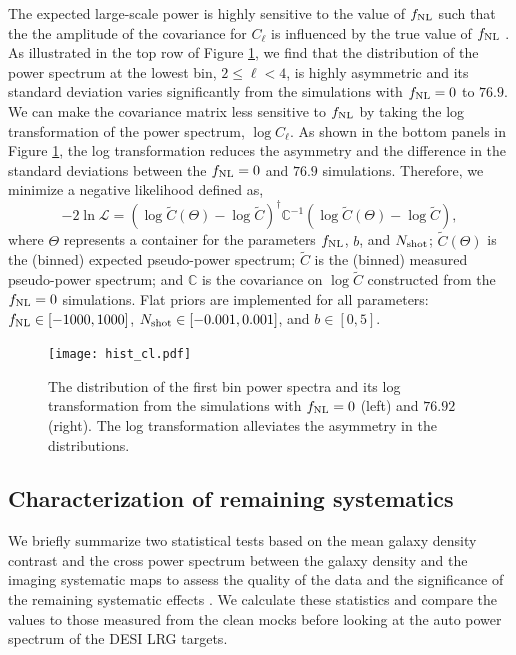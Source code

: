 The expected large-scale power is highly sensitive to the value of $f_{\rm NL}$ such that the the amplitude of the covariance for $C_{\ell}$ is influenced by the true value of $f_{\rm NL}$ \citep[see, e.g.,][for a discussion]{2013MNRAS.428.1116R}. As illustrated in the top row of Figure \ref{fig:histcell}, we find that the distribution of the power spectrum at the lowest bin, $2\leq \ell < 4$, is highly asymmetric and its standard deviation varies significantly from the simulations with $f_{\rm NL}=0$ to $76.9$. We can make the covariance matrix less sensitive to $f_{\rm NL}$ by taking the log transformation of the power spectrum, $\log C_{\ell}$. As shown in the bottom panels in Figure \ref{fig:histcell}, the log transformation reduces the asymmetry and the difference in the standard deviations between the $f_{\rm NL}=0$ and $76.9$ simulations. Therefore, we minimize a negative likelihood defined as,
\begin{equation}
-2\ln\mathcal{L} = (\log \tilde{C}(\Theta)-\log \tilde{C})^{\dagger} \mathbb{C}^{-1} (\log \tilde{C}(\Theta)-\log \tilde{C}),
\end{equation}
where $\Theta$ represents a container for the parameters $f_{\rm NL}$, $b$, and $N_{\rm shot}$; $\tilde{C}(\Theta)$ is the (binned) expected pseudo-power spectrum; $\tilde{C}$ is the (binned) measured pseudo-power spectrum; and $\mathbb{C}$ is the covariance on $\log\tilde{C}$ constructed from the $f_{\rm NL}=0$ simulations. Flat priors are implemented for all parameters: $f_{\rm NL} \in [-1000, 1000]$, $N_{\rm shot} \in [-0.001, 0.001]$, and $b \in [0, 5]$. 


\begin{figure}
\centering
\texttt{[image: hist\_cl.pdf]}
\caption{The distribution of the first bin power spectra and its log transformation from the simulations with $f_{\rm NL}=0$ (left) and $76.92$ (right). The log transformation alleviates the asymmetry in the distributions.}\label{fig:histcell}
\end{figure}




\subsection{Characterization of remaining systematics}
\label{ssec:characterization}
We briefly summarize two statistical tests based on the mean galaxy density contrast and the cross power spectrum between the galaxy density and the imaging systematic maps to assess the quality of the data and the significance of the remaining systematic effects \cite[see, also,][]{rezaie2021primordial}. We calculate these statistics and compare the values to those measured from the clean mocks before looking at the auto power spectrum of the DESI LRG targets.

